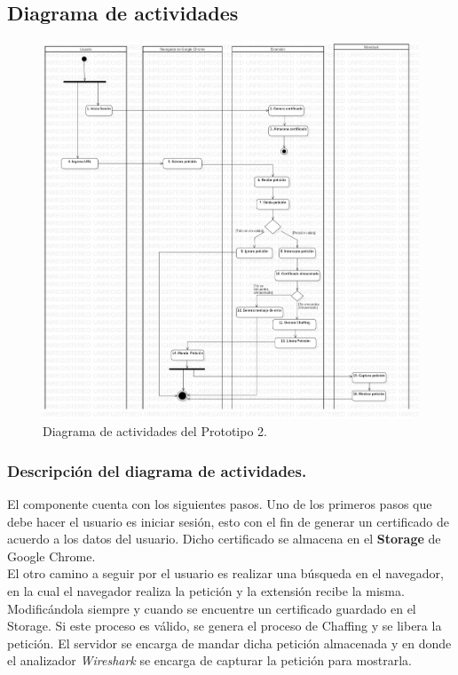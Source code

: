 \documentclass[12pt, a4paper, titlepage]{report}
\begin{document}
		    \subsection{Diagrama de actividades}
    		    \begin{figure}[H]
    				\begin{center}	\includegraphics[width=15cm]{./imagenes/Disenio/Componente_1/CI_DA_P1.png}
    					\caption{Diagrama de actividades del Prototipo 2.}
    				\end{center}
    			\end{figure}
    		
        		\subsubsection{Descripción del diagrama de actividades.}
        		El componente cuenta con los siguientes pasos.
            	Uno de los primeros pasos que debe hacer el usuario es iniciar sesión, esto con el fin de generar un certificado de acuerdo a los datos del usuario. Dicho certificado se almacena en el \textbf{Storage} de Google Chrome. \\
            	El otro camino a seguir por el usuario es realizar una búsqueda en el navegador, en la cual el navegador realiza la petición y la extensión recibe la misma. Modificándola siempre y cuando se encuentre un certificado guardado en el Storage. Si este proceso es válido, se genera el proceso de Chaffing y se libera la petición. El servidor se encarga de mandar dicha petición almacenada y en donde el analizador \textit{Wireshark} se encarga de capturar la petición para mostrarla.
			
\end{document}
